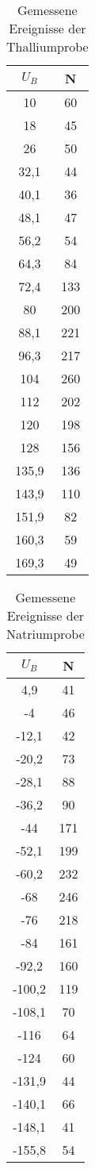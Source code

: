 \begin{table}
\centering
\caption{Gemessene Ereignisse der Thalliumprobe}
\begin{tabular}{cc}
\toprule
$U_B$ & N\\
\midrule
10&	60\\
18&	45\\
26&	50\\
32,1&	44\\
40,1&	36\\
48,1&	47\\
56,2&	54\\
64,3&	84\\
72,4&	133\\
80&	200\\
88,1&	221\\
96,3&	217\\
104&	260\\
112&	202\\
120&	198\\
128&	156\\
135,9&	136\\
143,9&	110\\
151,9&	82\\
160,3&	59\\
169,3&	49\\
\bottomrule
\end{tabular}
\label{tab:tl}
\end{table}

\begin{table}
\centering
\caption{Gemessene Ereignisse der Natriumprobe}
\begin{tabular}{cc}
\toprule
$U_B$ & N\\
\midrule
4,9&	41\\
-4&	46\\
-12,1&	42\\
-20,2&	73\\
-28,1&	88\\
-36,2&	90\\
-44&	171\\
-52,1&	199\\
-60,2&	232\\
-68&	246\\
-76&	218\\
-84&	161\\
-92,2&	160\\
-100,2&	119\\
-108,1&	70\\
-116&	64\\
-124&	60\\
-131,9&	44\\
-140,1&	66\\
-148,1&	41\\
-155,8&	54\\
\bottomrule
\end{tabular}
\label{tab:na}
\end{table}
